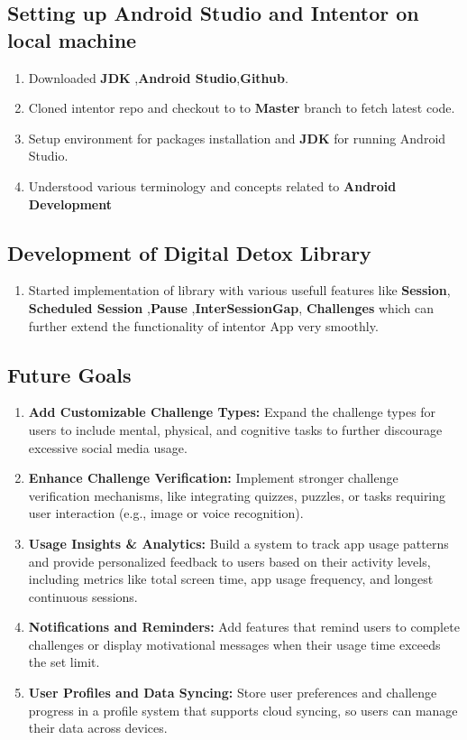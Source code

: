 \documentclass[12pt]{article}
\begin{document}
    \subsection{Setting up Android Studio and Intentor on local machine}
        \begin{enumerate}
            \item Downloaded \textbf{JDK} ,\textbf{Android Studio},\textbf{Github}.
            \item  Cloned intentor repo and checkout to to \textbf{Master} branch to fetch latest code.
            \item Setup environment for packages installation and \textbf{JDK} for running Android Studio.
             \item Understood various terminology and concepts related to \textbf{Android Development}
        \end{enumerate}
    \subsection{Development of Digital Detox Library}
    \begin{enumerate}
        
    \item Started implementation of library with various usefull features like \textbf{Session}, \textbf{Scheduled Session} ,\textbf{Pause} ,\textbf{InterSessionGap}, \textbf{Challenges}
    which can further extend the functionality of intentor App very smoothly.
    \end{enumerate}
    \subsection{Future Goals}
    \begin{enumerate}
      
        \item \textbf{Add Customizable Challenge Types:} Expand the challenge types for users to include mental, physical, and cognitive tasks to further discourage excessive social media usage.
        \item \textbf{Enhance Challenge Verification:} Implement stronger challenge verification mechanisms, like integrating quizzes, puzzles, or tasks requiring user interaction (e.g., image or voice recognition).
        \item \textbf{Usage Insights \& Analytics:} Build a system to track app usage patterns and provide personalized feedback to users based on their activity levels, including metrics like total screen time, app usage frequency, and longest continuous sessions.
        \item \textbf{Notifications and Reminders:} Add features that remind users to complete challenges or display motivational messages when their usage time exceeds the set limit.
        \item \textbf{User Profiles and Data Syncing:} Store user preferences and challenge progress in a profile system that supports cloud syncing, so users can manage their data across devices.
    \end{enumerate}
\end{document}

